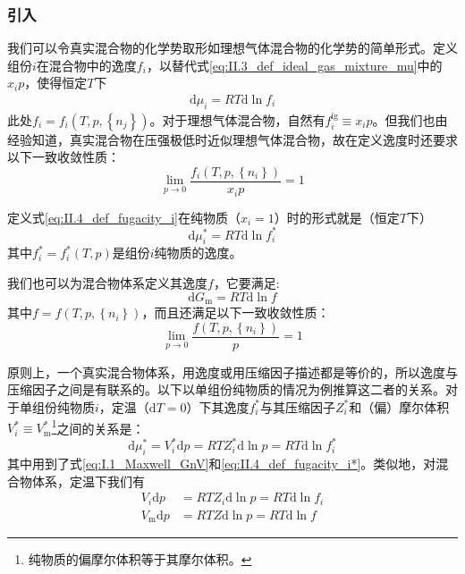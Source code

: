 \documentclass[main.tex]{subfiles}
\begin{document}
\subsubsection{引入}
我们可以令真实混合物的化学势取形如理想气体混合物的化学势的简单形式。定义组份$i$在混合物中的逸度$f_i$，以替代式\eqref{eq:II.3_def_ideal_gas_mixture_mu}中的$x_ip$，使得恒定$T$下
\begin{align}\label{eq:II.4_def_fugacity_i}
    \mathrm{d}\mu_i=RT\mathrm{d}\ln f_i
\end{align}
此处$f_i=f_i\left(T,p,\left\{n_j\right\}\right)$。对于理想气体混合物，自然有$f_i^\text{ig}\equiv x_i p$。但我们也由经验知道，真实混合物在压强极低时近似理想气体混合物，故在定义逸度时还要求以下一致收敛性质：
\[\lim_{p\to 0}\frac{f_i\left(T,p,\left\{n_i\right\}\right)}{x_i p}=1\]

定义式\eqref{eq:II.4_def_fugacity_i}在纯物质（$x_i=1$）时的形式就是（恒定$T$下）
\begin{equation}\label{eq:II.4_def_fugacity_i*}
    \mathrm{d}\mu_i^*=RT\mathrm{d}\ln f_i^*
\end{equation}
其中$f_i^*=f_i^*\left(T,p\right)$是组份$i$纯物质的逸度。

我们也可以为混合物体系定义其逸度$f$，它要满足:
\begin{equation}\label{II.4_def_fugacity_f}
    \mathrm{d}G_\text{m}=RT\mathrm{d}\ln f
\end{equation}
其中$f=f\left(T,p,\left\{n_i\right\}\right)$，而且还满足以下一致收敛性质：
\[\lim_{p\to 0}\frac{f\left(T,p,\left\{n_i\right\}\right)}{p}=1\]

原则上，一个真实混合物体系，用逸度或用压缩因子描述都是等价的，所以逸度与压缩因子之间是有联系的。以下以单组份纯物质的情况为例推算这二者的关系。对于单组份纯物质$i$，定温（$\mathrm{d}T=0$）下其逸度$f_i^*$与其压缩因子$Z_i^*$和（偏）摩尔体积$V^*_i\equiv V^*_\text{m}$\footnote{纯物质的偏摩尔体积等于其摩尔体积。}之间的关系是：
\[
    \mathrm{d}\mu_i^*=V_i^*\mathrm{d}p=RTZ_i^*\mathrm{d}\ln p=RT\mathrm{d}\ln f_i^*
\]
其中用到了式\eqref{eq:I.1_Maxwell_GnV}和\eqref{eq:II.4_def_fugacity_i*}。类似地，对混合物体系，定温下我们有
\begin{align*}
    V_i\mathrm{d}p        & =RTZ_i\mathrm{d}\ln p=RT\mathrm{d}\ln f_i \\
    V_\text{m}\mathrm{d}p & =RTZ\mathrm{d}\ln p=RT\mathrm{d}\ln f
\end{align*}
\end{document}
